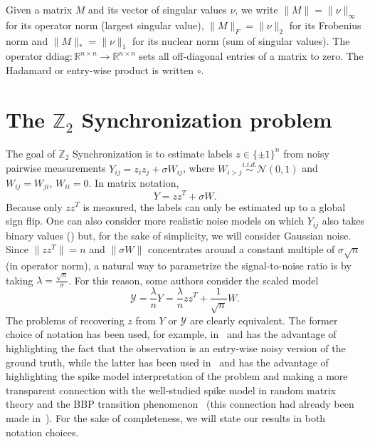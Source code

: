 \documentclass{colt2016} %
\newcommand{\Rnn}{{\mathbb{R}^{n\times n}}}
\newcommand{\1}{\mathbf{1}}
\newcommand{\ZZ}{\mathbb{Z}}
\newcommand{\YYY}{\mathcal{Y}}
\newcommand{\NNN}{\mathcal{N}}
\newcommand{\ddiag}{\mathrm{ddiag}}
\begin{document}
Given a matrix $M$ and its vector of singular values $\nu$, we write $\|M\| = \|\nu\|_\infty$ for its operator norm (largest singular value), $\|M\|_F = \|\nu\|_2$ for its Frobenius norm and $\|M\|_* = \|\nu\|_1$ for its nuclear norm (sum of singular values). The operator $\ddiag \colon \Rnn \to \Rnn$ sets all off-diagonal entries of a matrix to zero. The Hadamard or entry-wise product is written $\circ$.


\section{The $\ZZ_2$ Synchronization problem}

The goal of $\ZZ_2$ Synchronization is to estimate labels $z\in\{\pm 1\}^n$ from noisy pairwise measurements $Y_{ij} = z_iz_j + \sigma W_{ij}$, where $W_{i>j} \stackrel{i.i.d.}{\sim} \NNN(0,1)$ and $W_{ij}=W_{ji}$, $W_{ii} = 0$. In matrix notation,
\begin{equation}\label{eq:noisemodel:sigma}
 Y = zz^T + \sigma W.
\end{equation}
Because only $zz^T$ is measured, the labels can only be estimated up to a global sign flip. One can also consider more realistic noise models on which $Y_{ij}$ also takes binary values (\cite{abbe2014decoding}) but, for the sake of simplicity, we will consider Gaussian noise. Since $\|zz^T\| = n$ and $\|\sigma W\|$ concentrates around a constant multiple of $\sigma \sqrt{n}$ (in operator norm), a natural way to parametrize the signal-to-noise ratio is by taking $\lambda = \frac{\sqrt{n}}{\sigma}$. For this reason, some authors consider the scaled model
\begin{equation}\label{eq:noisemodel:lambda}
 \YYY = \frac{\lambda}{n}Y =  \frac{\lambda}{n}zz^T + \frac1{\sqrt{n}}W.
\end{equation}
The problems of recovering $z$ from $Y$ or $\YYY$ are clearly equivalent. The former choice of notation has been used, for example, in~\citep{bandeira2014tightness,bandeira2015laplacian} and has the advantage of highlighting the fact that the observation is an entry-wise noisy version of the ground truth, while the latter has been used in~\citep{javanmard2015phase} and has the advantage of highlighting the spike model interpretation of the problem and making a more transparent connection with the well-studied spike model in random matrix theory and the BBP transition phenomenon~\citep{BBP_MC_BBP_2005,Feral_Peche_BBPWigner} (this connection had already been made in~\citep{singer2010angular}). For the sake of completeness, we will state our results in both notation choices.
\end{document}
